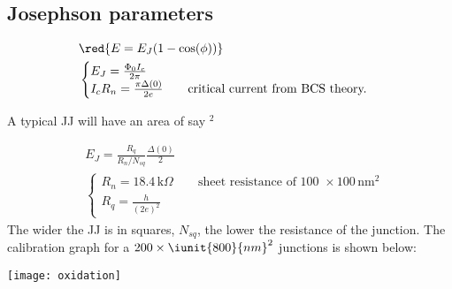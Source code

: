  \subsection{Josephson parameters}
 \label{sec:josephson-parameters}
 \begin{equation}
   \label{eq:fabrication_jj_1}
   \begin{aligned}
     & \red{E = E_J(1-\cos(\phi))} \\
     & \begin{cases}
       E_J = \frac{\Phi_0I_c}{2\pi}\\
       I_cR_n =  \frac{\pi\Delta(0)}{2e} \qquad  \text{critical current
         from BCS theory.}
     \end{cases}
   \end{aligned}
 \end{equation}

 \noindent A  typical JJ  will have  an area  of say  $^{2}$

 \begin{framed}\noindent
   \begin{equation}\label{eq:fabrication_jj_2}
     \begin{aligned}
       & E_J = \frac{R_q}{R_n/N_{sq}}\frac{\Delta(0)}{2}\\
       & \begin{cases}
         R_n = 18.4\,\text{k}\Omega \qquad \text{sheet resistance of 100 } \times 100\,\text{nm}^{2}\\
         R_q = \frac{h}{(2e)^2}
       \end{cases}
     \end{aligned}
   \end{equation}
   \noindent The wider the JJ is in  squares, $ N_{sq} $, the lower the
   resistance   of  the   junction.   The   calibration  graph   for  a
   $ 200 \times \iunit{800}{nm}^2 $ junctions is shown below:

   \texttt{[image: oxidation]}

 \end{framed}



